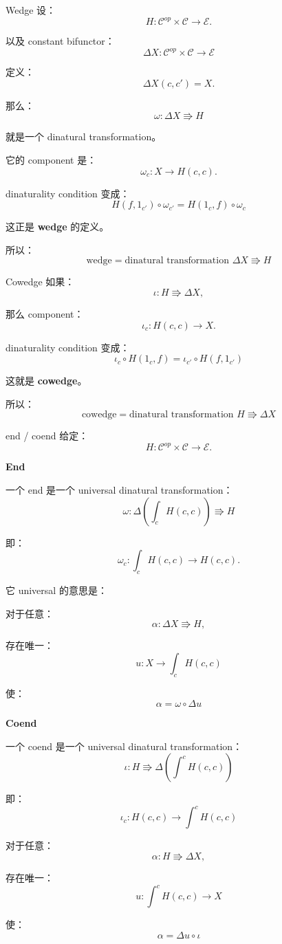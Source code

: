 \documentclass{beamer}
\begin{document}
\begin{frame}{Wedge}
设：
$$
H:\mathcal C^{op}\times\mathcal C\to\mathcal E.
$$

以及 constant bifunctor：
$$
\Delta X:\mathcal C^{op}\times\mathcal C\to\mathcal E
$$

定义：
$$
\Delta X(c,c')=X.
$$

那么：
$$
\boxed{
\omega:\Delta X\Rrightarrow H
}
$$

就是一个 dinatural transformation。

它的 component 是：
$$
\omega_c:X\to H(c,c).
$$

dinaturality condition 变成：
$$
\boxed{
H(f,1_{c'})\circ\omega_{c'}
=
H(1_c,f)\circ\omega_c
}
$$

这正是 \textbf{wedge} 的定义。

所以：
$$
\boxed{
\text{wedge}
=
\text{dinatural transformation }
\Delta X\Rrightarrow H
}
$$
\end{frame}

\begin{frame}{Cowedge}
如果：
$$
\iota:H\Rrightarrow\Delta X,
$$

那么 component：
$$
\iota_c:H(c,c)\to X.
$$

dinaturality condition 变成：
$$
\boxed{
\iota_c\circ H(1_c,f)
=
\iota_{c'}\circ H(f,1_{c'})
}
$$

这就是 \textbf{cowedge}。

所以：
$$
\boxed{
\text{cowedge}
=
\text{dinatural transformation }
H\Rrightarrow\Delta X
}
$$
\end{frame}

\begin{frame}[shrink]{end / coend}
给定：
$$
H:\mathcal C^{op}\times\mathcal C\to\mathcal E.
$$

\textbf{End}

一个 end 是一个 universal dinatural transformation：
$$
\boxed{
\omega:
\Delta\left(\int_cH(c,c)\right)
\Rrightarrow H
}
$$

即：
$$
\omega_c:
\int_cH(c,c)\to H(c,c).
$$

它 universal 的意思是：

对于任意：
$$
\alpha:\Delta X\Rrightarrow H,
$$

存在唯一：
$$
u:X\to\int_cH(c,c)
$$

使：
$$
\boxed{
\alpha=\omega\circ\Delta u
}
$$
\end{frame}

\begin{frame}
\textbf{Coend}

一个 coend 是一个 universal dinatural transformation：
$$
\boxed{
\iota:
H\Rrightarrow
\Delta\left(\int^cH(c,c)\right)
}
$$

即：
$$
\iota_c:
H(c,c)\to\int^cH(c,c)
$$

对于任意：
$$
\alpha:H\Rrightarrow\Delta X,
$$

存在唯一：
$$
u:\int^cH(c,c)\to X
$$

使：
$$
\boxed{
\alpha=\Delta u\circ\iota
}
$$
\end{frame}
\end{document}
